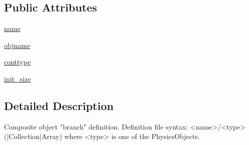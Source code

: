 \subsection*{Public Attributes}
\begin{DoxyCompactItemize}
\item 
\hyperlink{classpanda_1_1objbranch_1_1ObjBranch_a68aed6de89ff6987392264d4e5584066}{name}
\item 
\hyperlink{classpanda_1_1objbranch_1_1ObjBranch_ac85951a59870b6523cf4306fc46f48dd}{objname}
\item 
\hyperlink{classpanda_1_1objbranch_1_1ObjBranch_a967323925c61b02fa74cdb7bae0914ab}{conttype}
\item 
\hyperlink{classpanda_1_1objbranch_1_1ObjBranch_ae88a5a7a45165537947d2a32cdc42f27}{init\_\-size}
\end{DoxyCompactItemize}


\subsection{Detailed Description}
\begin{DoxyVerb}
Composite object "branch" definition. Definition file syntax:
<name>/<type>(|Collection|Array)
where <type> is one of the PhysicsObjects.
\end{DoxyVerb}
 

